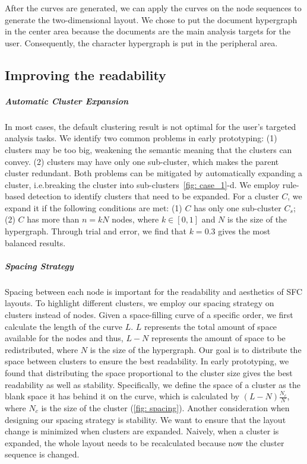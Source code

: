 After the curves are generated, we can apply the curves on the node sequences to generate the two-dimensional layout.
We chose to put the document hypergraph in the center area because the documents are the main analysis targets for the user.
Consequently, the character hypergraph is put in the peripheral area.

\subsection{Improving the readability}
\subparagraph{Automatic Cluster Expansion}
In most cases, the default clustering result is not optimal for the user's targeted analysis tasks.
We identify two common problems in early prototyping: 
(1) clusters may be too big, weakening the semantic meaning that the clusters can convey.
(2) clusters may have only one sub-cluster, which makes the parent cluster redundant. 
Both problems can be mitigated by automatically expanding a cluster, i.e.breaking the cluster into sub-clusters~\autoref{fig: case_1}-d.
We employ rule-based detection to identify clusters that need to be expanded.
For a cluster $C$, we expand it if the following conditions are met:
(1) $C$ has only one sub-cluster $C_s$;
(2) $C$ has more than $n = k N$ nodes, where $k \in [0, 1]$ and $N$ is the size of the hypergraph.
Through trial and error, we find that $k=0.3$ gives the most balanced results.
\vspace*{-0.3cm}
\subparagraph{Spacing Strategy}
Spacing between each node is important for the readability and aesthetics of SFC layouts.
To highlight different clusters, we employ our spacing strategy on clusters instead of nodes.
Given a space-filling curve of a specific order, we first calculate the length of the curve $L$.
$L$ represents the total amount of space available for the nodes and thus,
$L - N$ represents the amount of space to be redistributed, where $N$ is the size of the hypergraph.
Our goal is to distribute the space between clusters to ensure the best readability.
In early prototyping, we found that distributing the space proportional to the cluster size gives the best readability as well as stability.
Specifically, we define the space of a cluster as the blank space it has behind it on the curve, which is calculated by $(L-N)\frac{N_c}{N}$, where $N_c$ is the size of the cluster (\autoref{fig: spacing}).
Another consideration when designing our spacing strategy is stability.
We want to ensure that the layout change is minimized when clusters are expanded.
Naively, when a cluster is expanded, the whole layout needs to be recalculated because now the cluster sequence is changed.
